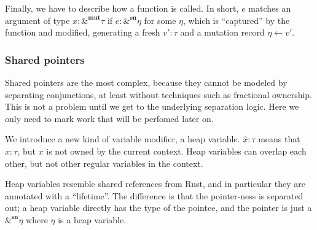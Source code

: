 \documentclass[acmsmall,nonacm]{acmart}
\newcommand{\core}[1]{{\mid}#1{\mid}}
\newcommand{\proves}{\vdash}
\newcommand{\makes}{\dashv}
\newcommand*{\axiom}[2][]{\infer[#1]{}{#2}}
\begin{document}
Finally, we have to describe how a function is called. In short, $e$ matches an argument of type $x:\&^\mathbf{mut}\tau$ if $e:\&^\mathbf{sn}\eta$ for some $\eta$, which is ``captured'' by the function and modified, generating a fresh $v':\tau$ and a mutation record $\eta\gets v'$.

\subsubsection{Shared pointers}

Shared pointers are the most complex, because they cannot be modeled by separating conjunctions, at least without techniques such as fractional ownership. This is not a problem until we get to the underlying separation logic. Here we only need to mark work that will be perfomed later on.

We introduce a new kind of variable modifier, a heap variable. $\hat x:\tau$ means that $x:\tau$, but $x$ is not owned by the current context. Heap variables can overlap each other, but not other regular variables in the context.

Heap variables resemble shared references from Rust, and in particular they are annotated with a ``lifetime''. The difference is that the pointer-ness is separated out; a heap variable directly has the type of the pointee, and the pointer is just a $\&^\mathbf{sn}\eta$ where $\eta$ is a heap variable.

\end{document}

